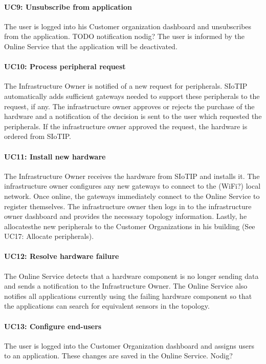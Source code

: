 \documentclass[english,peerreview]{sareport}
\begin{document}
\paragraph{UC9: Unsubscribe from application}
The user is logged into his Customer organization dashboard and unsubscribes from the application. TODO notification nodig? The user is informed by the Online Service that the application will be deactivated.

\paragraph{UC10: Process peripheral request}
The Infrastructure Owner is notified of a new request for peripherals. SIoTIP automatically adds sufficient gateways needed to support these peripherals to the request, if any. The infrastructure owner approves or rejects the purchase of the hardware and a notification of the decision is sent to the user which requested the peripherals. If the infrastructure owner approved the request, the hardware is ordered from SIoTIP.

\paragraph{UC11: Install new hardware}
The Infrastructure Owner receives the hardware from SIoTIP and installs it. The infrastructure owner configures any new gateways to connect to the (WiFi?) local network. Once online, the gateways immediately connect to the Online Service to register themselves. The infrastructure owner then logs in to the infrastructure owner dashboard and provides the necessary topology information. Lastly, he allocatesthe new peripherals to the Customer Organizations in his building (See UC17: Allocate peripherals).

\paragraph{UC12: Resolve hardware failure}
The Online Service detects that a hardware component is no longer sending data and sends a notification to the Infrastructure Owner. The Online Service also notifies all applications currently using the failing hardware component so that the applications can search for equivalent sensors in the topology. 

\paragraph{UC13: Configure end-users}
The user is logged into the Customer Organization dashboard and assigns users to an application. These changes are saved in the Online Service.
Nodig?
\end{document}
